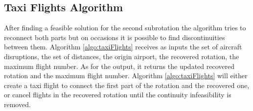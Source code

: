 \subsection{Taxi Flights Algorithm} \label{sec:taxiFlights}
After finding a feasible solution for the second subrotation the algorithm tries to reconnect both parts but on occasions it is possible to find discontinuities between them. Algorithm \ref{algo:taxiFlights}  receives as inputs the set of aircraft disruptions, the set of distances, the origin airport, the recovered rotation, the maximum flight number. As for the output, it returns the updated recovered rotation and the maximum flight number. Algorithm \ref{algo:taxiFlights} will either create a taxi flight to connect the first part of the rotation and the recovered one, or cancel flights in the recovered rotation until the continuity infeasibility is removed. 


